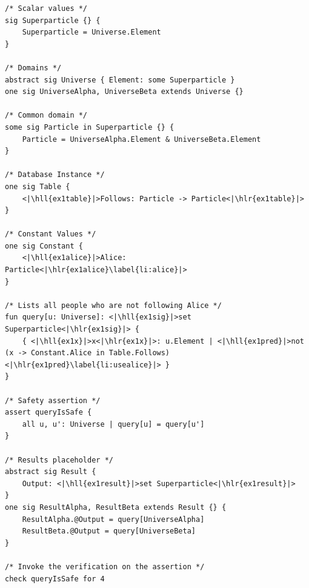 \newpage
\begin{lstlisting}[language=alloy,basicstyle={\footnotesize\ttfamily},caption={The complete Alloy program which verifies the query {\protect $Q_\text{\,not\,following\,Alice}$} as shown in \autoref{ex:major-ex1}. Alloy codes highlighted in yellow indicate portions of code which are translated according to and depending on the original database schema and the \textsc{drc} query.},label={src:major-ex1},aboveskip=0pc,belowskip=0pc]
/* Scalar values */
sig Superparticle {} {
	Superparticle = Universe.Element
}

/* Domains */
abstract sig Universe { Element: some Superparticle }
one sig UniverseAlpha, UniverseBeta extends Universe {}

/* Common domain */
some sig Particle in Superparticle {} {
	Particle = UniverseAlpha.Element & UniverseBeta.Element
}

/* Database Instance */
one sig Table {
    <|\hll{ex1table}|>Follows: Particle -> Particle<|\hlr{ex1table}|>
}

/* Constant Values */
one sig Constant {
    <|\hll{ex1alice}|>Alice: Particle<|\hlr{ex1alice}\label{li:alice}|>
}

/* Lists all people who are not following Alice */
fun query[u: Universe]: <|\hll{ex1sig}|>set Superparticle<|\hlr{ex1sig}|> {
    { <|\hll{ex1x}|>x<|\hlr{ex1x}|>: u.Element | <|\hll{ex1pred}|>not (x -> Constant.Alice in Table.Follows)<|\hlr{ex1pred}\label{li:usealice}|> }
}

/* Safety assertion */
assert queryIsSafe {
    all u, u': Universe | query[u] = query[u']
}

/* Results placeholder */
abstract sig Result {
    Output: <|\hll{ex1result}|>set Superparticle<|\hlr{ex1result}|>
}
one sig ResultAlpha, ResultBeta extends Result {} {
    ResultAlpha.@Output = query[UniverseAlpha]
    ResultBeta.@Output = query[UniverseBeta]
}

/* Invoke the verification on the assertion */
check queryIsSafe for 4
\end{lstlisting}

